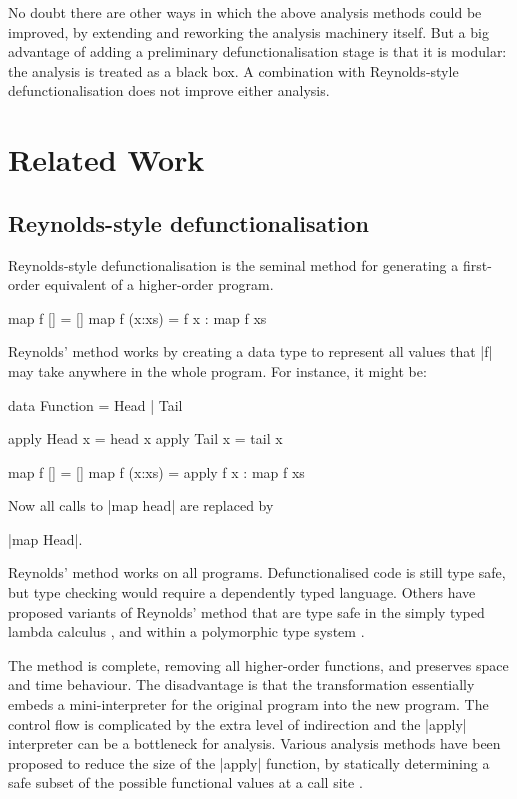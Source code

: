 \documentclass{sigplanconf}
\begin{document}
No doubt there are other ways in which the above analysis methods could be improved, by extending and reworking the analysis machinery itself. But a big advantage of adding a preliminary defunctionalisation stage is that it is modular: the analysis is treated as a black box. A combination with Reynolds-style defunctionalisation does not improve either analysis.

\section{Related Work}
\label{sec:related}

\subsection{Reynolds-style defunctionalisation}

Reynolds-style defunctionalisation \cite{reynolds:defunc} is the seminal method for generating a first-order equivalent of a higher-order program.

\begin{example}
\begin{code}
map f []      = []
map f (x:xs)  = f x : map f xs
\end{code}

\noindent Reynolds' method works by creating a data type to represent all values that |f| may take anywhere in the whole program. For instance, it might be:

\ignore\begin{code}
data Function = Head | Tail

apply Head  x = head  x
apply Tail  x = tail  x

map f []      = []
map f (x:xs)  = apply f x : map f xs
\end{code}

\noindent Now all calls to |map head| are replaced by \ignore|map Head|.
\end{example}

Reynolds' method works on all programs. Defunctionalised code is still type safe, but type checking would require a dependently typed language. Others have proposed variants of Reynolds' method that are type safe in the simply typed lambda calculus \cite{bell:type_driven_defunctionalization}, and within a polymorphic type system \cite{pottier:polymorhpic_typed_defunctionaization}.

The method is complete, removing all higher-order functions, and preserves space and time behaviour. The disadvantage is that the transformation essentially embeds a mini-interpreter for the original program into the new program. The control flow is complicated by the extra level of indirection and the |apply| interpreter can be a bottleneck for analysis. Various analysis methods have been proposed to reduce the size of the |apply| function, by statically determining a safe subset of the possible functional values at a call site \cite{cejtin:closure_conversion,grin}.
\end{document}
